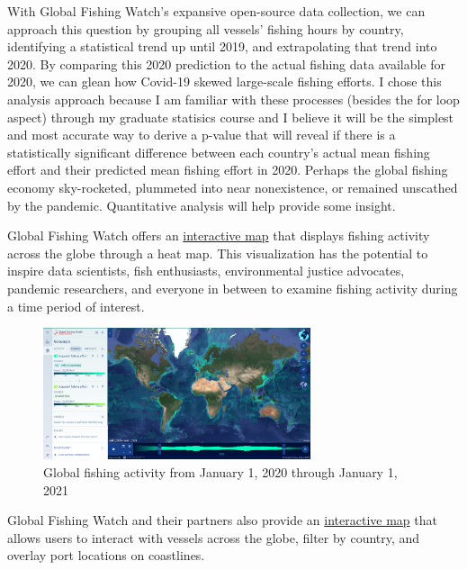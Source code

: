 \documentclass[
]{article}
\begin{document}
With Global Fishing Watch's expansive open-source data collection, we
can approach this question by grouping all vessels' fishing hours by
country, identifying a statistical trend up until 2019, and
extrapolating that trend into 2020. By comparing this 2020 prediction to
the actual fishing data available for 2020, we can glean how Covid-19
skewed large-scale fishing efforts. I chose this analysis approach
because I am familiar with these processes (besides the for loop aspect)
through my graduate statisics course and I believe it will be the
simplest and most accurate way to derive a p-value that will reveal if
there is a statistically significant difference between each country's
actual mean fishing effort and their predicted mean fishing effort in
2020. Perhaps the global fishing economy sky-rocketed, plummeted into
near nonexistence, or remained unscathed by the pandemic. Quantitative
analysis will help provide some insight.

Global Fishing Watch offers an
\href{https://globalfishingwatch.org/map/?latitude=19\&longitude=-30\&zoom=1.5\&start=2021-08-26T23\%3A00\%3A00.000Z\&end=2021-11-27T00\%3A00\%3A00.000Z}{interactive
map} that displays fishing activity across the globe through a heat map.
This visualization has the potential to inspire data scientists, fish
enthusiasts, environmental justice advocates, pandemic researchers, and
everyone in between to examine fishing activity during a time period of
interest.

\begin{figure}
\centering
\includegraphics[width=0.7\textwidth,height=\textheight]{pictures/fishing_gfw_map_2020.png}
\caption{Global fishing activity from January 1, 2020 through January 1,
2021}
\end{figure}

Global Fishing Watch and their partners also provide an
\href{https://globalfishingwatch.org/carrier-portal/?latitude=12.7069821\&longitude=19.1776829\&zoom=1.1903704\&layer\%5B0\%5D=encounter\&layer\%5B1\%5D=cp_rfmo\&layer\%5B2\%5D=cp_next_port\&dataset=carriers:v20211001\&tab=flags}{interactive
map} that allows users to interact with vessels across the globe, filter
by country, and overlay port locations on coastlines.
\end{document}
